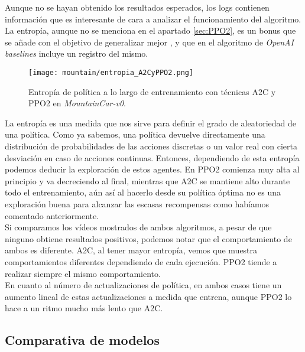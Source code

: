\documentclass[11pt,fleqn]{book} %
\begin{document}
Aunque no se hayan obtenido los resultados esperados, los logs contienen información que es interesante de cara a analizar el funcionamiento del algoritmo. La entropía, aunque no se menciona en el apartado \ref{sec:PPO2}, es un bonus que se añade con el objetivo de generalizar mejor \cite{article:PPO2}, y que en el algoritmo de \textit{OpenAI baselines} incluye un registro del mismo.

\begin{figure}[H]
	\centering\texttt{[image: mountain/entropia\_A2CyPPO2.png]}
	\caption{Entropía de política a lo largo de entrenamiento con técnicas A2C y PPO2 en \textit{MountainCar-v0}.}
	\label{fig:entropiaA2CyPPO2} %
\end{figure}

La entropía es una medida que nos sirve para definir el grado de aleatoriedad de una política. Como ya sabemos, una política devuelve directamente una distribución de probabilidades de las acciones discretas o un valor real con cierta desviación en caso de acciones continuas. Entonces, dependiendo de esta entropía podemos deducir la exploración de estos agentes. En PPO2 comienza muy alta al principio y va decreciendo al final, mientras que A2C se mantiene alto durante todo el entrenamiento, aún así al hacerlo desde su política óptima no es una exploración buena para alcanzar las escasas recompensas como habíamos comentado anteriormente. \\

Si comparamos los vídeos mostrados de ambos algoritmos, a pesar de que ninguno obtiene resultados positivos, podemos notar que el comportamiento de ambos es diferente. A2C, al tener mayor entropía, vemos que muestra comportamientos diferentes dependiendo de cada ejecución. PPO2 tiende a realizar siempre el mismo comportamiento. \\

En cuanto al número de actualizaciones de política, en ambos casos tiene un aumento lineal de estas actualizaciones a medida que entrena, aunque PPO2 lo hace a un ritmo mucho más lento que A2C. \\

\subsection{Comparativa de modelos}
\end{document}
